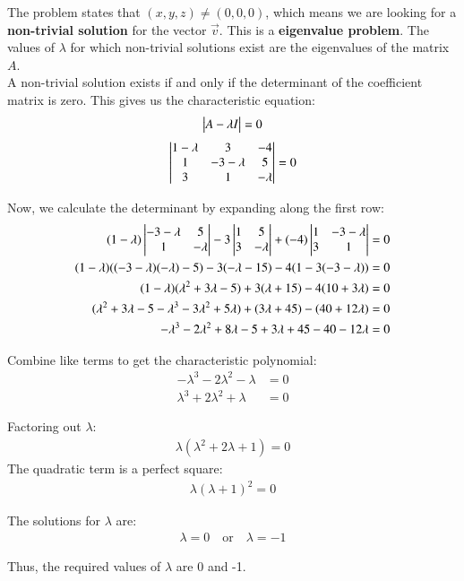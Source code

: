 \documentclass[journal]{IEEEtran}
\begin{document}
The problem states that $(x, y, z) \neq (0, 0, 0)$, which means we are looking for a \textbf{non-trivial solution} for the vector $\vec{v}$. This is a \textbf{eigenvalue problem}. The values of $\lambda$ for which non-trivial solutions exist are the eigenvalues of the matrix $A$.\\
A non-trivial solution exists if and only if the determinant of the coefficient matrix is zero. This gives us the characteristic equation:
\begin{align}
\begin{vmatrix}A - \lambda I\end{vmatrix} = 0
\end{align}
\begin{align}
\begin{vmatrix}
1-\lambda & 3 & -4 \\
1 & -3-\lambda & 5 \\
3 & 1 & -\lambda
\end{vmatrix}= 0
\end{align}

Now, we calculate the determinant by expanding along the first row:
\begin{align}
(1-\lambda) \begin{vmatrix}-3-\lambda & 5 \\ 1 & -\lambda\end{vmatrix} - 3 \begin{vmatrix} 1 & 5 \\ 3 & -\lambda \end{vmatrix} + (-4) \begin{vmatrix} 1 & -3-\lambda \\ 3 & 1 \end{vmatrix} &=0 \\
(1-\lambda)((-3-\lambda)(-\lambda) - 5) - 3(-\lambda - 15) - 4(1 - 3(-3-\lambda)) &= 0\\
(1-\lambda)(\lambda^2 + 3\lambda - 5) + 3(\lambda + 15) - 4(10 + 3\lambda) &= 0\\
(\lambda^2 + 3\lambda - 5 - \lambda^3 - 3\lambda^2 + 5\lambda) + (3\lambda + 45) - (40 + 12\lambda) &= 0\\
-\lambda^3 - 2\lambda^2 + 8\lambda - 5 + 3\lambda + 45 - 40 - 12\lambda &= 0
\end{align}

Combine like terms to get the characteristic polynomial:
\begin{align}
-\lambda^3 - 2\lambda^2 - \lambda &= 0 \\
\lambda^3 + 2\lambda^2 + \lambda &= 0
\end{align}

Factoring out $\lambda$:
\begin{align}
\lambda(\lambda^2 + 2\lambda + 1) = 0
\end{align}
The quadratic term is a perfect square:
\begin{align}
\lambda(\lambda + 1)^2 = 0
\end{align}

The solutions for $\lambda$ are:
\begin{align}
\lambda = 0 \quad \text{or} \quad \lambda = -1
\end{align}

Thus, the required values of $\lambda$ are 0 and -1.

\
\end{document}
